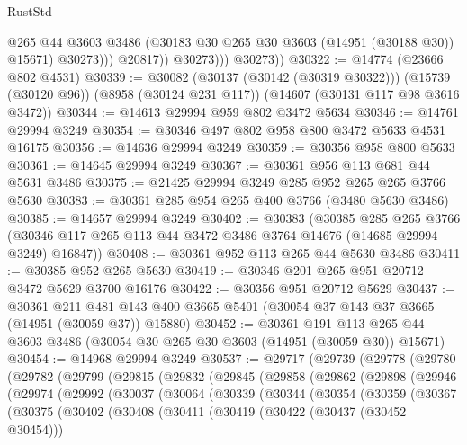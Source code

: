\begin{lexlean}{RustStd}
\begin{coremodule}
                        @265
                        @44
                        @3603
                        @3486
                        (@30183 @30 @265 @30 @3603 (@14951 (@30188 @30)) @15671)
                        @30273)))
                  @20817))
              @30273)))
        @30273))
@30322 := @14774 (@23666 @802 @4531)
@30339 := @30082
    (@30137 (@30142 (@30319 @30322)))
    (@15739 (@30120 @96))
    (@8958 (@30124 @231 @117))
    (@14607 (@30131 @117 @98 @3616 @3472))
@30344 := @14613 @29994 @959 @802 @3472 @5634
@30346 := @14761 @29994 @3249
@30354 := @30346 @497 @802 @958 @800 @3472 @5633 @4531 @16175
@30356 := @14636 @29994 @3249
@30359 := @30356 @958 @800 @5633
@30361 := @14645 @29994 @3249
@30367 := @30361 @956 @113 @681 @44 @5631 @3486
@30375 := @21425 @29994 @3249 @285 @952 @265 @265 @3766 @5630
@30383 := @30361 @285 @954 @265 @400 @3766 (@3480 @5630 @3486)
@30385 := @14657 @29994 @3249
@30402 := @30383
    (@30385
      @285
      @265
      @3766
      (@30346 @117 @265 @113 @44 @3472 @3486 @3764 @14676 (@14685 @29994 @3249) @16847))
@30408 := @30361 @952 @113 @265 @44 @5630 @3486
@30411 := @30385 @952 @265 @5630
@30419 := @30346 @201 @265 @951 @20712 @3472 @5629 @3700 @16176
@30422 := @30356 @951 @20712 @5629
@30437 := @30361
    @211
    @481
    @143
    @400
    @3665
    @5401
    (@30054 @37 @143 @37 @3665 (@14951 (@30059 @37)) @15880)
@30452 := @30361
    @191
    @113
    @265
    @44
    @3603
    @3486
    (@30054 @30 @265 @30 @3603 (@14951 (@30059 @30)) @15671)
@30454 := @14968 @29994 @3249
@30537 := @29717
    (@29739
      (@29778
        (@29780
          (@29782
            (@29799
              (@29815
                (@29832
                  (@29845
                    (@29858
                      (@29862
                        (@29898
                          (@29946
                            (@29974
                              (@29992
                                (@30037
                                  (@30064
                                    (@30339
                                      (@30344
                                        (@30354
                                          (@30359
                                            (@30367
                                              (@30375
                                                (@30402
                                                  (@30408
                                                    (@30411
                                                      (@30419
                                                        (@30422 (@30437 (@30452 @30454)))

\end{coremodule}
\end{lexlean}

